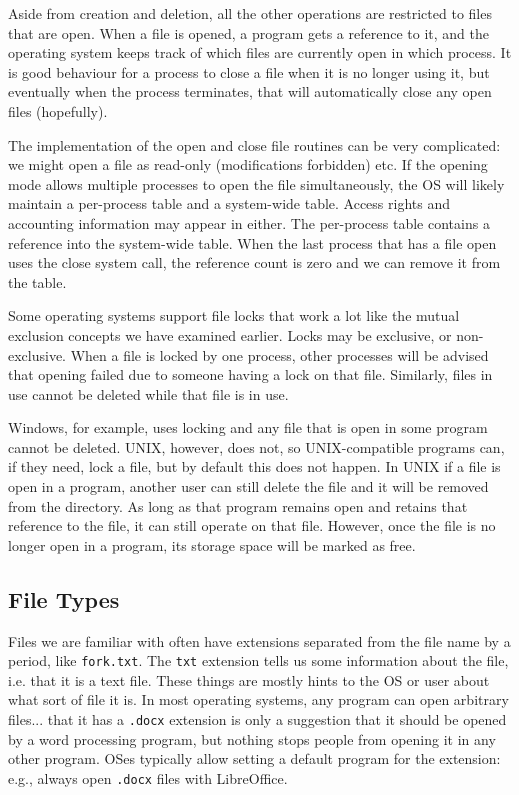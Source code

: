 Aside from creation and deletion, all the other operations are restricted to files that are open. When a file is opened, a program gets a reference to it, and the operating system keeps track of which files are currently open in which process. It is good behaviour for a process to close a file when it is no longer using it, but eventually when the process terminates, that will automatically close any open files (hopefully).

The implementation of the open and close file routines can be very complicated: we might open a file as read-only (modifications forbidden) etc. If the opening mode allows multiple processes to open the file simultaneously, the OS will likely maintain a per-process table and a system-wide table. Access rights and accounting information may appear in either. The per-process table contains a reference into the system-wide table. When the last process that has a file open uses the close system call, the reference count is zero and we can remove it from the table.

Some operating systems support file locks that work a lot like the mutual exclusion concepts we have examined earlier. Locks may be exclusive, or non-exclusive. When a file is locked by one process, other processes will be advised that opening failed due to someone having a lock on that file. Similarly, files in use cannot be deleted while that file is in use. 

Windows, for example, uses locking and any file that is open in some program cannot be deleted. UNIX, however, does not, so UNIX-compatible programs can, if they need, lock a file, but by default this does not happen. In UNIX if a file is open in a program, another user can still delete the file and it will be removed from the directory. As long as that program remains open and retains that reference to the file, it can still operate on that file. However, once the file is no longer open in a program, its storage space will be marked as free.

\subsection*{File Types}

Files we are familiar with often have extensions separated from the file name by a period, like \texttt{fork.txt}. The \texttt{txt} extension tells us some information about the file, i.e. that it is a text file. These things are mostly hints to the OS or user about what sort of file it is. In most operating systems, any program can open arbitrary files... that it has a \texttt{.docx} extension is only a suggestion that it should be opened by a word processing program, but nothing stops people from opening it in any other program. OSes typically allow setting a default program for the extension: e.g., always open \texttt{.docx} files with LibreOffice.

